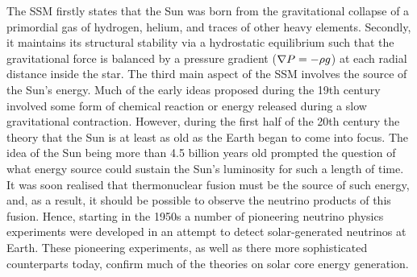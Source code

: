 The SSM firstly states that the Sun was born from the gravitational collapse of a primordial gas of hydrogen, helium, and traces of other heavy elements. Secondly, it maintains its structural stability via a hydrostatic equilibrium such that the gravitational force is balanced by a pressure gradient (${\bf \nabla }{P}=-\rho g$) at each radial distance inside the star. The third main aspect of the SSM involves the source of the Sun's energy. Much of the early ideas proposed during the 19th century involved some form of chemical reaction or energy released during a slow gravitational contraction. However, during the first half of the 20th century the theory that the Sun is at least as old as the Earth began to come into focus. The idea of the Sun being more than 4.5 billion years old prompted the question of what energy source could sustain the Sun's luminosity for such a length of time. It was soon realised that thermonuclear fusion must be the source of such energy, and, as a result, it should be possible to observe the neutrino products of this fusion. Hence, starting in the 1950s a number of pioneering neutrino physics experiments were developed in an attempt to detect solar-generated neutrinos at Earth. These pioneering experiments, as well as there more sophisticated counterparts today, confirm much of the theories on solar core energy generation.

